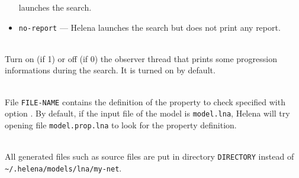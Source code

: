\begin{description}
\begin{itemize}
    launches the search.
  \item \texttt{no-report} --- Helena launches the search but does not
    print any report.
  \end{itemize}
\item{}\\ Turn on (if 1) or
  off (if 0) the observer thread that prints some progression
  informations during the search.  It is turned on by default.
\item{}\\ File \texttt{FILE-NAME}
  contains the definition of the property to check specified with
  option .  By default, if the input file
  of the model is \texttt{model.lna}, Helena will try opening file
  \texttt{model.prop.lna} to look for the property definition.
\item{}\\ All generated files
  such as source files are put in directory \texttt{DIRECTORY} instead
  of \texttt{\~{}/.helena/models/lna/my-net}.
\end{description}


